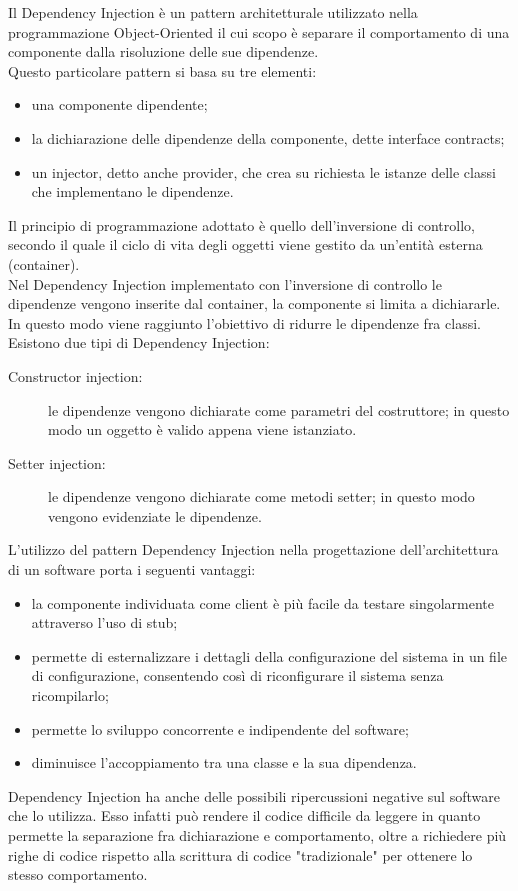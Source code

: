 	 \label{app:dependencyinjection}
Il Dependency Injection è un pattern architetturale utilizzato nella programmazione Object-Oriented il cui scopo è separare il comportamento di una componente dalla risoluzione delle sue dipendenze. \\
Questo particolare pattern si basa su tre elementi:
\begin{itemize}
\item una componente dipendente;
\item la dichiarazione delle dipendenze della componente, dette interface contracts;
\item un injector, detto anche provider, che crea su richiesta le istanze delle classi che implementano le dipendenze.
\end{itemize}
Il principio di programmazione adottato è quello dell'inversione di controllo, secondo il quale il ciclo di vita degli oggetti viene gestito da un'entità esterna (container).\\
Nel Dependency Injection implementato con l'inversione di controllo le dipendenze vengono inserite dal container, la componente si limita a dichiararle. In questo modo viene raggiunto l'obiettivo di ridurre le dipendenze fra classi.\\
Esistono due tipi di Dependency Injection:
\begin{description}
	\item[Constructor injection:] le dipendenze vengono dichiarate come parametri del costruttore; in questo modo un oggetto è valido appena viene istanziato.
	\item[Setter injection:] le dipendenze vengono dichiarate come metodi setter; in questo modo vengono evidenziate le dipendenze.
\end{description}

L'utilizzo del pattern Dependency Injection nella progettazione dell'architettura di un software porta i seguenti vantaggi:
\begin{itemize}
\item la componente individuata come client è più facile da testare singolarmente attraverso l'uso di stub;
\item permette di esternalizzare i dettagli della configurazione del sistema in un file di configurazione, consentendo così di riconfigurare il sistema senza ricompilarlo;
\item permette lo sviluppo concorrente e indipendente del software;
\item diminuisce l'accoppiamento tra una classe e la sua dipendenza.
\end{itemize}
Dependency Injection ha anche delle possibili ripercussioni negative sul software che lo utilizza. Esso infatti può rendere il codice difficile da leggere in quanto permette la separazione fra dichiarazione e comportamento, oltre a richiedere più righe di codice rispetto alla scrittura di codice "tradizionale" per ottenere lo stesso comportamento.

